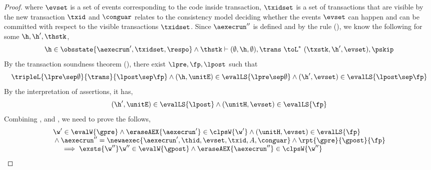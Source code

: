 \begin{proof}
where \( \evset \) is a set of events corresponding to the code inside transaction, \( \txidset \) is  a set of transactions that are visible by the new transaction \( \txid \) and \( \conguar \) relates to the consistency model deciding whether the events \( \evset \) can happen and can be committed with respect to the visible transactions \( \txidset \).
Since \( \aexecrun'' \) is defined and by the  rule (), we know the following for some \( \h, \h', \thstk \),
\begin{equation}
    \label{equ:local-transfer}
    \h \in \obsstate{\aexecrun', \txidset, \respo}
    \land \thstk \vdash (\emptyset, \h, \emptyset) , \trans \ \toL^{*} \  (\txstk, \h', \evset) , \pskip 
\end{equation}
By the transaction soundness theorem (), there exist \( \lpre, \fp, \lpost \) such that
\[ 
\tripleL{\lpre \sep \emptyset}{\trans}{\lpost \sep \fp} \land (\h, \unitE) \in \evalLS{\lpre \sep \emptyset} \land (\h', \evset) \in \evalLS{\lpost \sep \fp}
\]
By the interpretation of assertions, it has,
\begin{equation}
\label{equ:interpretation-local-post}        
(\h', \unitE) \in \evalLS{\lpost} \land (\unitH, \evset) \in \evalLS{\fp}
\end{equation}
Combining ,  and , we need to prove the follows,
\[
    \begin{array}[t]{@{}l@{}}
    \w' \in \evalW{\gpre} 
    \land \eraseAEX{ \aexecrun' } \in \clpsW{\w'}
    \land (\unitH, \evset) \in \evalLS{\fp} \\
    {} \land \aexecrun'' = \newaexec{\aexecrun', \thid, \evset, \txid, A, \conguar } 
    \land \rpt{\gpre}{\gpost}{\fp} \\
    \quad {} \implies 
    \exsts{\w''}
    \w'' \in \evalW{\gpost} 
    \land \eraseAEX{ \aexecrun'' } \in \clpsW{\w''}

    \end{array}
\]
\end{proof}
